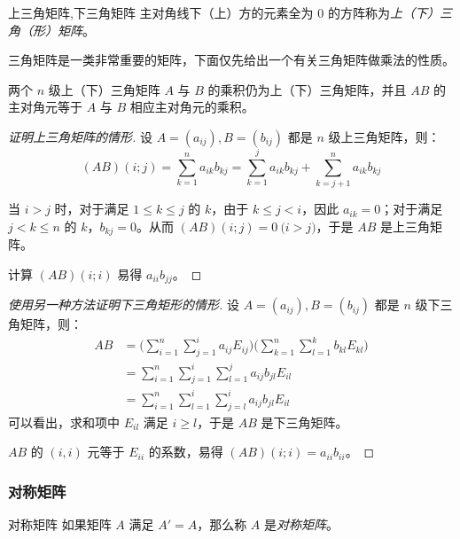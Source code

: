 \begin{definition}{上三角矩阵,下三角矩阵}
	主对角线下（上）方的元素全为 $0$ 的方阵称为\emph{上（下）三角（形）矩阵}。
\end{definition}

三角矩阵是一类非常重要的矩阵，下面仅先给出一个有关三角矩阵做乘法的性质。

\begin{theorem}
	两个 $n$ 级上（下）三角矩阵 $A$ 与 $B$ 的乘积仍为上（下）三角矩阵，并且 $AB$ 的主对角元等于 $A$ 与 $B$ 相应主对角元的乘积。
\end{theorem}

\begin{proof}[证明上三角矩阵的情形]
	设 $A = (a_{ij}), B = (b_{ij})$ 都是 $n$ 级上三角矩阵，则：
	$$
	(AB)(i; j) = \sum\limits_{k = 1}^n a_{ik} b_{kj} = \sum\limits_{k = 1}^j a_{ik}b_{kj} + \sum\limits_{k = j + 1}^n a_{ik} b_{kj}
	$$

	当 $i > j$ 时，对于满足 $1 \le k \le j$ 的 $k$，由于 $k \le j < i$，因此 $a_{ik} = 0$；对于满足 $j < k \le n$ 的 $k$，$b_{kj} = 0$。从而 $(AB)(i; j) = 0 \pod{i > j}$，于是 $AB$ 是上三角矩阵。

	计算 $(AB)(i; i)$ 易得 $a_{ii} b_{jj}$。
\end{proof}

\begin{proof}[使用另一种方法证明下三角矩形的情形]
	设 $A = (a_{ij}), B = (b_{ij})$ 都是 $n$ 级下三角矩阵，则：
	$$
	\begin{aligned}
		AB &= \biggl( \sum_{i = 1}^n \sum_{j = 1}^i a_{ij} E_{ij} \biggr) \biggl( \sum_{k = 1}^n \sum_{l = 1}^k b_{kl} E_{kl} \biggr)
		\\&=
		\sum_{i = 1}^n \sum_{j = 1}^i \sum_{l = 1}^j a_{ij} b_{jl} E_{il}
		\\&=
		\sum_{i = 1}^n \sum_{l = 1}^i \sum_{j = l}^i a_{ij} b_{jl} E_{il}
	\end{aligned}
	$$
	可以看出，求和项中 $E_{il}$ 满足 $i \ge l$，于是 $AB$ 是下三角矩阵。

	$AB$ 的 $(i, i)$ 元等于 $E_{ii}$ 的系数，易得 $(AB)(i; i) = a_{ii} b_{ii}$。
\end{proof}

\subsubsection{对称矩阵}

\begin{definition}{对称矩阵}
	如果矩阵 $A$ 满足 $A' = A$，那么称 $A$ 是\emph{对称矩阵}。
\end{definition}

